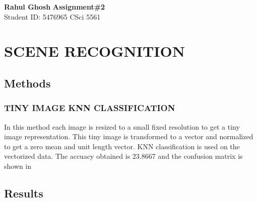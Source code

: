 \documentclass[letter, 10pt]{article}
\begin{document}
\noindent
\large \textbf{Rahul Ghosh} \hfill \textbf{Assignment\#2}\\
\normalsize Student ID: 5476965 \hfill CSci 5561\\

\section*{SCENE RECOGNITION}
\subsection*{Methods}
\subsubsection*{TINY IMAGE KNN CLASSIFICATION}
In this method each image is resized to a small fixed resolution to get a tiny image representation. This tiny image is transformed to a vector and normalized to get a zero mean and unit length vector. KNN classification is used on the vectorized data. The accuacy obtained is 23.8667 and the confusion matrix is shown in 


\subsection*{Results}
\end{document}
